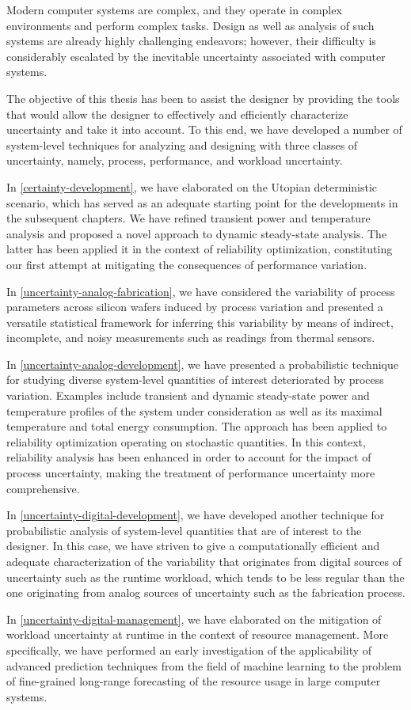 Modern computer systems are complex, and they operate in complex environments
and perform complex tasks. Design as well as analysis of such systems are
already highly challenging endeavors; however, their difficulty is considerably
escalated by the inevitable uncertainty associated with computer systems.

The objective of this thesis has been to assist the designer by providing the
tools that would allow the designer to effectively and efficiently characterize
uncertainty and take it into account. To this end, we have developed a number of
system-level techniques for analyzing and designing with three classes of
uncertainty, namely, process, performance, and workload uncertainty.

In \cref{certainty-development}, we have elaborated on the Utopian deterministic
scenario, which has served as an adequate starting point for the developments in
the subsequent chapters. We have refined transient power and temperature
analysis and proposed a novel approach to dynamic steady-state analysis. The
latter has been applied it in the context of reliability optimization,
constituting our first attempt at mitigating the consequences of performance
variation.

In \cref{uncertainty-analog-fabrication}, we have considered the variability of
process parameters across silicon wafers induced by process variation and
presented a versatile statistical framework for inferring this variability by
means of indirect, incomplete, and noisy measurements such as readings from
thermal sensors.

In \cref{uncertainty-analog-development}, we have presented a probabilistic
technique for studying diverse system-level quantities of interest deteriorated
by process variation. Examples include transient and dynamic steady-state power
and temperature profiles of the system under consideration as well as its
maximal temperature and total energy consumption. The approach has been applied
to reliability optimization operating on stochastic quantities. In this context,
reliability analysis has been enhanced in order to account for the impact of
process uncertainty, making the treatment of performance uncertainty more
comprehensive.

In \cref{uncertainty-digital-development}, we have developed another technique
for probabilistic analysis of system-level quantities that are of interest to
the designer. In this case, we have striven to give a computationally efficient
and adequate characterization of the variability that originates from digital
sources of uncertainty such as the runtime workload, which tends to be less
regular than the one originating from analog sources of uncertainty such as the
fabrication process.

In \cref{uncertainty-digital-management}, we have elaborated on the mitigation
of workload uncertainty at runtime in the context of resource management.
More specifically, we have performed an early investigation of the applicability
of advanced prediction techniques from the field of machine learning to the
problem of fine-grained long-range forecasting of the resource usage in large
computer systems.
